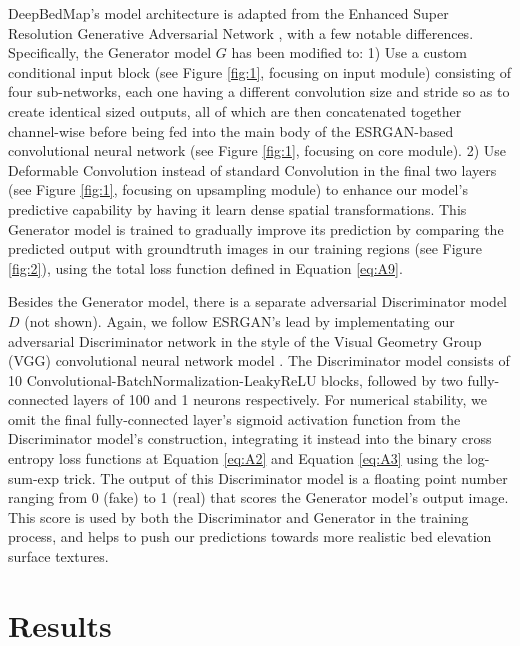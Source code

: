 \documentclass[tc, manuscript]{copernicus}
\begin{document}
DeepBedMap's model architecture is adapted from the Enhanced Super Resolution Generative Adversarial Network \citep[ESRGAN,][]{WangESRGANEnhancedSuperResolution2018}, with a few notable differences.
Specifically, the Generator model $G$ has been modified to:
1) Use a custom conditional input block (see Figure \ref{fig:1}, focusing on input module) consisting of four sub-networks, each one having a different convolution size and stride so as to create identical sized outputs, all of which are then concatenated together channel-wise before being fed into the main body of the ESRGAN-based convolutional neural network (see Figure \ref{fig:1}, focusing on core module).
2) Use Deformable Convolution \citep{DaiDeformableConvolutionalNetworks2017} instead of standard Convolution in the final two layers (see Figure \ref{fig:1}, focusing on upsampling module) to enhance our model's predictive capability by having it learn dense spatial transformations.
This Generator model is trained to gradually improve its prediction by comparing the predicted output with groundtruth images in our training regions (see Figure \ref{fig:2}), using the total loss function defined in Equation \eqref{eq:A9}.

Besides the Generator model, there is a separate adversarial Discriminator model $D$ (not shown).
Again, we follow ESRGAN's \citep{WangESRGANEnhancedSuperResolution2018} lead by implementating our adversarial Discriminator network in the style of the Visual Geometry Group (VGG) convolutional neural network model \citep{SimonyanVeryDeepConvolutional2014}.
The Discriminator model consists of 10 Convolutional-BatchNormalization-LeakyReLU blocks, followed by two fully-connected layers of 100 and 1 neurons respectively.
For numerical stability, we omit the final fully-connected layer's sigmoid activation function from the Discriminator model's construction, integrating it instead into the binary cross entropy loss functions at Equation \eqref{eq:A2} and Equation \eqref{eq:A3} using the log-sum-exp trick.
The output of this Discriminator model is a floating point number ranging from 0 (fake) to 1 (real) that scores the Generator model's output image.
This score is used by both the Discriminator and Generator in the training process, and helps to push our predictions towards more realistic bed elevation surface textures.


\section{Results}
\end{document}
